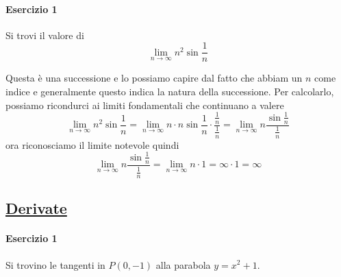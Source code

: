\paragraph{Esercizio 1}
Si trovi il valore di
\begin{equation*}
  \lim\limits_{n \to \infty} n^2\sin \frac{1}{n}
\end{equation*}
\divisor

Questa è una successione e lo possiamo capire dal fatto che abbiam un $n$ come indice e 
generalmente questo indica la natura della successione. Per calcolarlo, possiamo ricondurci ai
limiti fondamentali che continuano a valere
\begin{equation*}
  \lim\limits_{n \to \infty} n^2\sin \frac{1}{n} = 
  \lim\limits_{n \to \infty} n\cdot n\sin \frac{1}{n}\cdot \frac{\frac{1}{n}}{\frac{1}{n}} =
  \lim\limits_{n \to \infty} n \frac{\sin \frac{1}{n}}{\frac{1}{n}}
\end{equation*}
ora riconosciamo il limite notevole quindi
\begin{equation*}
  \lim\limits_{n \to \infty} n \frac{\sin \frac{1}{n}}{\frac{1}{n}} =
  \lim\limits_{n \to \infty} n\cdot1 = \infty\cdot1=\boxed{\infty}
\end{equation*}

\subsection*{\hyperref[sec:derivate]{Derivate}}\label{sub:derivate}

\paragraph{Esercizio 1}
Si trovino le tangenti in $P(0,-1)$ alla parabola $y=x^2+1$.
\divisor

